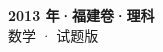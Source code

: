\documentclass[zihao=-4, a4paper]{ctexart}
\begin{document}
\begin{center}
  {\Large\bfseries 2013 年·福建卷·理科}\\[4pt]
  {\large 数学 · 试题版}
\end{center}
\medskip
{}

\end{document}
